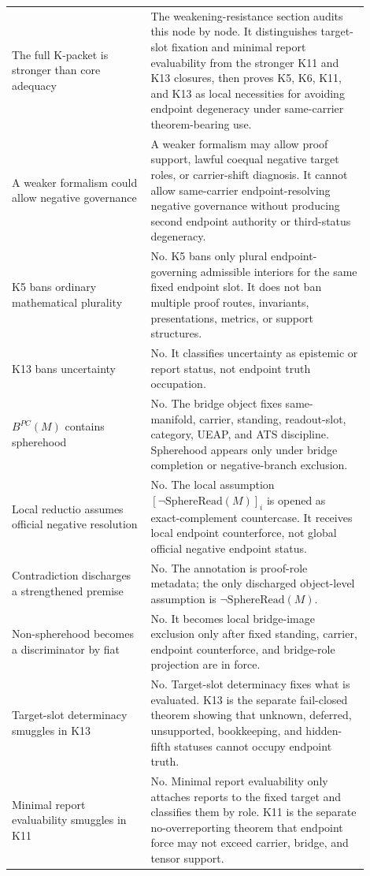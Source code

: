 \documentclass[11pt]{article}
\newcommand{\SphereRead}{\mathrm{SphereRead}}
\newcommand{\BridgeObjPC}{B^{PC}}
\begin{document}
\begin{longtable}{L{0.35\linewidth}L{0.55\linewidth}}
The full K-packet is stronger than core adequacy & The weakening-resistance section audits this node by node. It distinguishes target-slot fixation and minimal report evaluability from the stronger K11 and K13 closures, then proves K5, K6, K11, and K13 as local necessities for avoiding endpoint degeneracy under same-carrier theorem-bearing use.\\
A weaker formalism could allow negative governance & A weaker formalism may allow proof support, lawful coequal negative target roles, or carrier-shift diagnosis. It cannot allow same-carrier endpoint-resolving negative governance without producing second endpoint authority or third-status degeneracy.\\
K5 bans ordinary mathematical plurality & No. K5 bans only plural endpoint-governing admissible interiors for the same fixed endpoint slot. It does not ban multiple proof routes, invariants, presentations, metrics, or support structures.\\
K13 bans uncertainty & No. It classifies uncertainty as epistemic or report status, not endpoint truth occupation.\\
\(\BridgeObjPC(M)\) contains spherehood & No. The bridge object fixes same-manifold, carrier, standing, readout-slot, category, UEAP, and ATS discipline. Spherehood appears only under bridge completion or negative-branch exclusion.\\
Local reductio assumes official negative resolution & No. The local assumption \([\neg\SphereRead(M)]_i\) is opened as exact-complement countercase. It receives local endpoint counterforce, not global official negative endpoint status.\\
Contradiction discharges a strengthened premise & No. The annotation is proof-role metadata; the only discharged object-level assumption is \(\neg\SphereRead(M)\).\\
Non-spherehood becomes a discriminator by fiat & No. It becomes local bridge-image exclusion only after fixed standing, carrier, endpoint counterforce, and bridge-role projection are in force.\\
Target-slot determinacy smuggles in K13 & No. Target-slot determinacy fixes what is evaluated. K13 is the separate fail-closed theorem showing that unknown, deferred, unsupported, bookkeeping, and hidden-fifth statuses cannot occupy endpoint truth.\\
Minimal report evaluability smuggles in K11 & No. Minimal report evaluability only attaches reports to the fixed target and classifies them by role. K11 is the separate no-overreporting theorem that endpoint force may not exceed carrier, bridge, and tensor support.\\
\bottomrule
\end{longtable}
\end{document}
